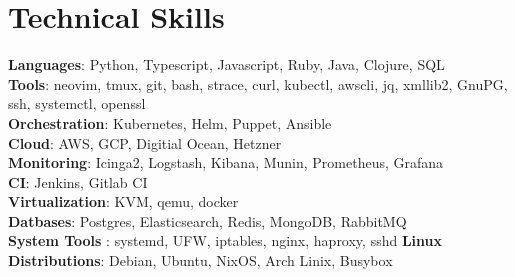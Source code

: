 \documentclass[letterpaper,11pt]{article}
\begin{document}
\section{Technical Skills}
 \begin{itemize}[leftmargin=0.15in, label={}]
    \small{\item{
     \textbf{Languages}{: Python, Typescript, Javascript, Ruby, Java, Clojure, SQL } \\
     \textbf{Tools}{: neovim, tmux, git, bash, strace, curl, kubectl, awscli, jq, xmllib2, GnuPG, ssh, systemctl, openssl } \\
     \textbf{Orchestration}{: Kubernetes, Helm, Puppet, Ansible } \\
     \textbf{Cloud}{: AWS, GCP, Digitial Ocean, Hetzner } \\
     \textbf{Monitoring}{: Icinga2, Logstash, Kibana, Munin, Prometheus, Grafana } \\
     \textbf{CI}{: Jenkins, Gitlab CI } \\
     \textbf{Virtualization}{: KVM, qemu, docker } \\
     \textbf{Datbases}{: Postgres, Elasticsearch, Redis, MongoDB, RabbitMQ } \\
     \textbf{System Tools}{ : systemd, UFW, iptables, nginx, haproxy, sshd }
     \textbf{Linux Distributions}{: Debian, Ubuntu, NixOS, Arch Linix, Busybox } \\
    }}
 \end{itemize}
\end{document}
